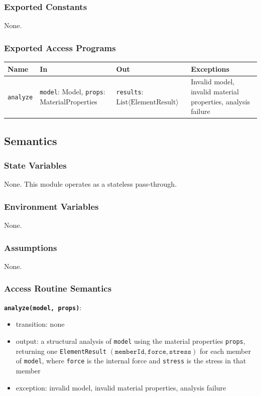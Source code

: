 \documentclass[12pt, titlepage]{article}
\begin{document}
\subsubsection{Exported Constants}
None.

\subsubsection{Exported Access Programs}
\begin{tabularx}{\textwidth}{p{2.6cm} p{5.2cm} p{4.4cm} X}
\toprule
\textbf{Name} & \textbf{In} & \textbf{Out} & \textbf{Exceptions} \\
\midrule
\texttt{analyze} & \texttt{model}: Model, \texttt{props}: MaterialProperties & \texttt{results}: $\text{List}\langle \text{ElementResult} \rangle$ & Invalid model, invalid material properties, analysis failure \\
\bottomrule
\end{tabularx}

\subsection{Semantics}

\subsubsection{State Variables}
None. This module operates as a stateless pass-through.

\subsubsection{Environment Variables}
None.

\subsubsection{Assumptions}
None.

\subsubsection{Access Routine Semantics}

\textbf{\texttt{analyze(model, props)}}:
\begin{itemize}
  \item transition: none
  \item output: a structural analysis of \texttt{model} using the material properties \texttt{props}, returning one \texttt{ElementResult} $(\texttt{memberId}, \texttt{force}, \texttt{stress})$ for each member of \texttt{model}, where \texttt{force} is the internal force and \texttt{stress} is the stress in that member
  \item exception: invalid model, invalid material properties, analysis failure
\end{itemize}
\end{document}
